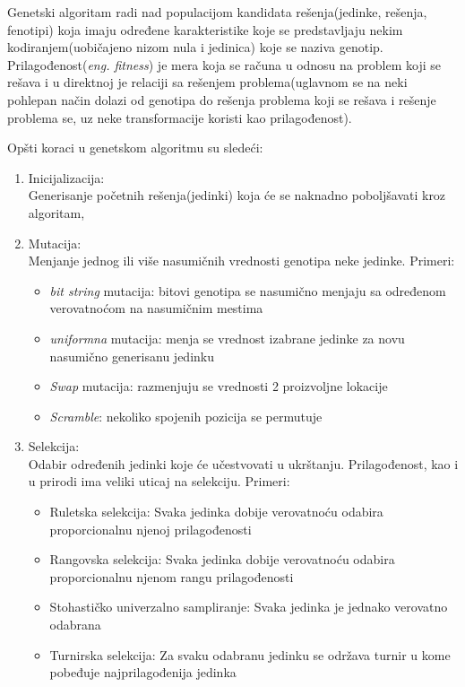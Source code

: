 \documentclass[a4paper]{article}
\begin{document}
Genetski algoritam radi nad populacijom kandidata rešenja(jedinke, rešenja, fenotipi) koja imaju određene karakteristike koje se predstavljaju nekim kodiranjem(uobičajeno nizom nula i jedinica) koje se naziva genotip.\cite{whitley} Prilagođenost(\emph {eng. fitness}) je mera koja se računa u odnosu na problem koji se rešava i u direktnoj je relaciji sa rešenjem problema(uglavnom se na neki pohlepan način dolazi od genotipa do rešenja problema koji se rešava i rešenje problema se, uz neke transformacije koristi kao prilagođenost).

Opšti koraci u genetskom algoritmu su sledeći:

\begin{enumerate}

\item Inicijalizacija:\\ Generisanje početnih rešenja(jedinki) koja će se naknadno poboljšavati kroz algoritam,
\item Mutacija: \\ Menjanje jednog ili više nasumičnih vrednosti genotipa neke jedinke. Primeri:
\begin{itemize}
\item \emph{bit string} mutacija: bitovi genotipa se nasumično menjaju sa određenom verovatnoćom na nasumičnim mestima
\item \emph{uniformna} mutacija: menja se vrednost izabrane jedinke za novu nasumično generisanu jedinku
\item \emph{Swap} mutacija: razmenjuju se vrednosti 2 proizvoljne lokacije
\item \emph{Scramble}: nekoliko spojenih pozicija se permutuje
\end{itemize}
\item Selekcija: \\ Odabir određenih jedinki koje će učestvovati u ukrštanju. Prilagođenost, kao i u prirodi ima veliki uticaj na selekciju. Primeri:
\begin{itemize}
\item Ruletska selekcija: Svaka jedinka dobije verovatnoću odabira proporcionalnu njenoj prilagođenosti
\item Rangovska selekcija: Svaka jedinka dobije verovatnoću odabira proporcionalnu njenom rangu prilagođenosti
\item Stohastičko univerzalno sampliranje: Svaka jedinka je jednako verovatno odabrana
\item Turnirska selekcija: Za svaku odabranu jedinku se održava turnir u kome pobeđuje najprilagođenija jedinka

\end{itemize}
\end{enumerate}
\end{document}
